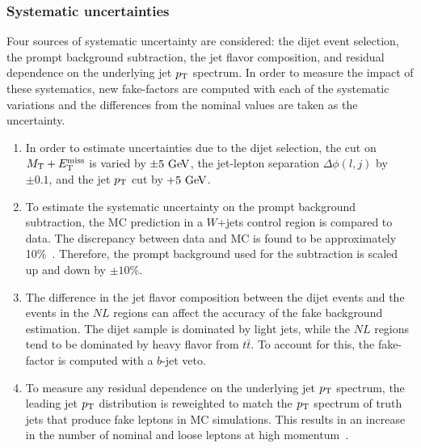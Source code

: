 %
\subsubsection{Systematic uncertainties}\label{ssww13tev:ff_systematics}
Four sources of systematic uncertainty are considered: the dijet event selection, the prompt background subtraction, the jet flavor composition, and residual dependence on the underlying jet $p_{\mathrm{T}}$ spectrum.
In order to measure the impact of these systematics, new fake-factors are computed with each of the systematic variations and the differences from the nominal values are taken as the uncertainty.
\begin{enumerate}
\item In order to estimate uncertainties due to the dijet selection, the cut on $M_{\textrm{T}}+E_{\mathrm{T}}^{\mathrm{miss}}$ is varied by $\pm5\gev$, the jet-lepton separation $\Delta\phi(l,j)$ by $\pm 0.1$, and the jet $p_{\mathrm{T}}$ cut by $+5\gev$.
\item To estimate the systematic uncertainty on the prompt background subtraction, the MC prediction in a $W$+jets control region is compared to data.  The discrepancy between data and MC is found to be approximately 10\%~\cite{2018.ssww-13tev-atlas-support}.  Therefore, the prompt background used for the subtraction is scaled up and down by $\pm 10\%$.
\item The difference in the jet flavor composition between the dijet events and the events in the $NL$ regions can affect the accuracy of the fake background estimation.  The dijet sample is dominated by light jets, while the $NL$ regions tend to be dominated by heavy flavor from $t\bar{t}$.  To account for this, the fake-factor is computed with a $b$-jet veto.
\item To measure any residual dependence on the underlying jet $p_{\mathrm{T}}$ spectrum, the leading jet $p_{\mathrm{T}}$ distribution is reweighted to match the $p_{\mathrm{T}}$ spectrum of truth jets that produce fake leptons in MC simulations.  This results in an increase in the number of nominal and loose leptons at high momentum~\cite{2018.ssww-13tev-atlas-support}.
\end{enumerate}

